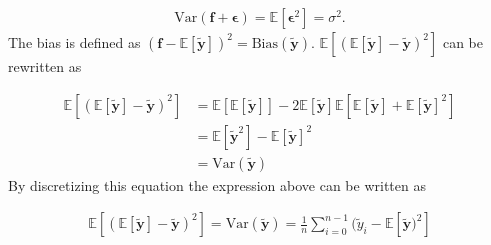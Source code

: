 \documentclass[../main.tex]{subfiles}
\begin{document}
\begin{align*}
    \mathrm{Var}(\mathbf{f}+\boldsymbol{\epsilon})=\mathbb{E}[\boldsymbol{\epsilon}^2]=\sigma^2.
\end{align*} The bias is defined as \ensuremath{(\mathbf{f}-\mathbb{E}[\mathbf{\tilde{y}}])^2=\mathrm{Bias}(\mathbf{\tilde{y}})}. \ensuremath{\mathbb{E}[(\mathbb{E}[\mathbf{\tilde{y}}]-\mathbf{\tilde{y}})^2]} can be rewritten as

\begin{align*}
    \mathbb{E}[(\mathbb{E}[\mathbf{\tilde{y}}]-\mathbf{\tilde{y}})^2] &=\mathbb{E}[\mathbb{E}[\mathbf{\tilde{y}}]]-2\mathbb{E}[\mathbf{\tilde{y}}]\mathbb{E}[\mathbb{E}[\mathbf{\tilde{y}}]+\mathbb{E}[\mathbf{\tilde{y}}]^2]\\
    &=\mathbb{E}[\mathbf{\tilde{y}}^2]-\mathbb{E}[\mathbf{\tilde{y}}]^2\\
    &=\mathrm{Var}(\mathbf{\tilde{y}})
\end{align*} By discretizing this equation the expression above can be written as

\begin{align*}
    \mathbb{E}[(\mathbb{E}[\mathbf{\tilde{y}}]-\mathbf{\tilde{y}})^2]=\mathrm{Var}(\mathbf{\tilde{y}})=\frac{1}{n}\sum_{i=0}^{n-1}(\tilde{y}_i-\mathbb{E}[\mathbf{\tilde{y}})^2]
\end{align*}
\end{document}
